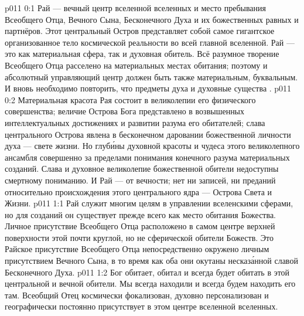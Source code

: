 \author{Совершенствователь Мудрости}
\vs p011 0:1 Рай --- вечный центр вселенной вселенных и место пребывания Всеобщего Отца, Вечного Сына, Бесконечного Духа и их божественных равных и партнёров. Этот центральный Остров представляет собой самое гигантское организованное тело космической реальности во всей главной вселенной. Рай --- это как материальная сфера, так и духовная обитель. Всё разумное творение Всеобщего Отца расселено на материальных местах обитания; поэтому и абсолютный управляющий центр должен быть также материальным, буквальным. И вновь необходимо повторить, что предметы духа и духовные существа .
\vs p011 0:2 Материальная красота Рая состоит в великолепии его физического совершенства; величие Острова Бога представлено в возвышенных интеллектуальных достижениях и развитии разума его обитателей; слава центрального Острова явлена в бесконечном даровании божественной личности духа --- свете жизни. Но глуб\'ины духовной красоты и чудеса этого великолепного ансамбля совершенно за пределами понимания конечного разума материальных созданий. Слава и духовное великолепие божественной обители недоступны смертному пониманию. И Рай --- от вечности; нет ни записей, ни преданий относительно происхождения этого центрального ядра --- Острова Света и Жизни.
\vs p011 1:1 Рай служит многим целям в управлении вселенскими сферами, но для созданий он существует прежде всего как место обитания Божества. Личное присутствие Всеобщего Отца расположено в самом центре верхней поверхности этой почти круглой, но не сферической обители Божеств. Это Райское присутствие Всеобщего Отца непосредственно окружено личным присутствием Вечного Сына, в то время как оба они окутаны несказ\'анной славой Бесконечного Духа.
\vs p011 1:2 Бог обитает, обитал и всегда будет обитать в этой центральной и вечной обители. Мы всегда находили и всегда будем находить его там. Всеобщий Отец космически фокализован, духовно персонализован и географически постоянно присутствует в этом центре вселенной вселенных.

